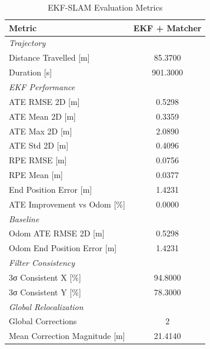 \begin{table}[htbp]
\centering
\caption{EKF-SLAM Evaluation Metrics}
\label{tab:ekf_results}
\begin{tabular}{lc}
\toprule
Metric & \textbf{EKF + Matcher} \\
\midrule
\multicolumn{2}{l}{\textit{Trajectory}} \\
Distance Travelled [m] & 85.3700 \\
Duration [s] & 901.3000 \\
\midrule
\multicolumn{2}{l}{\textit{EKF Performance}} \\
ATE RMSE 2D [m] & 0.5298 \\
ATE Mean 2D [m] & 0.3359 \\
ATE Max 2D [m] & 2.0890 \\
ATE Std 2D [m] & 0.4096 \\
RPE RMSE [m] & 0.0756 \\
RPE Mean [m] & 0.0377 \\
End Position Error [m] & 1.4231 \\
ATE Improvement vs Odom [\%] & 0.0000 \\
\midrule
\multicolumn{2}{l}{\textit{Baseline}} \\
Odom ATE RMSE 2D [m] & 0.5298 \\
Odom End Position Error [m] & 1.4231 \\
\midrule
\multicolumn{2}{l}{\textit{Filter Consistency}} \\
3σ Consistent X [\%] & 94.8000 \\
3σ Consistent Y [\%] & 78.3000 \\
\midrule
\multicolumn{2}{l}{\textit{Global Relocalization}} \\
Global Corrections & 2 \\
Mean Correction Magnitude [m] & 21.4140 \\
\midrule
\bottomrule
\end{tabular}
\end{table}